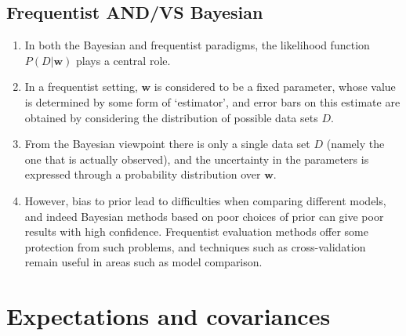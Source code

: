 \subsection{Frequentist AND/VS Bayesian}

\begin{enumerate}
    \item In both the Bayesian and frequentist paradigms, the likelihood function $P(D|\bm{w})$ plays a central role.
    \hfill \cite{ml/book/Pattern-Recognition-And-Machine-Learning/Christopher-M-Bishop}

    \item In a frequentist setting, $\bm{w}$ is considered to be a fixed parameter, whose value is determined by some form of ‘estimator’, and error bars on this estimate are obtained by considering the distribution of possible data sets $D$.
    \hfill \cite{ml/book/Pattern-Recognition-And-Machine-Learning/Christopher-M-Bishop}

    \item From the Bayesian viewpoint there is only a single data set $D$ (namely the one that is actually observed), and the uncertainty in the parameters is expressed through a probability distribution over $\bm{w}$.
    \hfill \cite{ml/book/Pattern-Recognition-And-Machine-Learning/Christopher-M-Bishop}

    \item However, bias to prior lead to difficulties when comparing different models, and indeed Bayesian methods based on poor choices of prior can give poor results with high confidence.
    Frequentist evaluation methods offer some protection from such problems, and techniques such as cross-validation remain useful in areas such as model comparison.
    \hfill \cite{ml/book/Pattern-Recognition-And-Machine-Learning/Christopher-M-Bishop}
\end{enumerate}








\section{Expectations and covariances}

